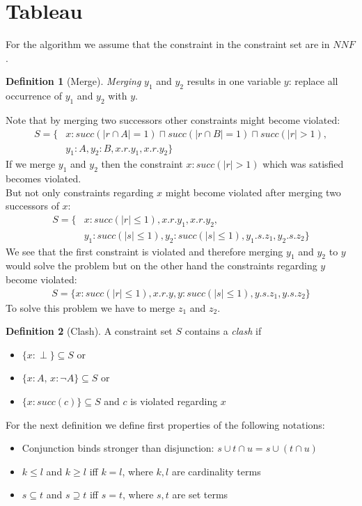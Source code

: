 \documentclass[a4paper,11pt]{scrartcl}
\theoremstyle{break}
\theoremstyle{definition}
\newtheorem{mydef}{Definition}
\begin{document}
\section{Tableau}
For the algorithm we assume that the constraint in the constraint set are in $NNF$.
\begin{mydef}[Merge]
\textit{Merging} $y_1$ and $y_2$ results in one variable $y$: replace all occurrence of $y_1$ and $y_2$ with $y$. 
\end{mydef}
Note that by merging two successors other constraints might become violated:
\begin{align}
S=\{&x:succ(|r\cap A|=1)\sqcap succ(|r\cap B|=1)\sqcap succ(|r|>1),\nonumber\\ &y_1:A, y_2:B, x.r.y_1, x.r.y_2\}
\end{align}
If we merge $y_1$ and $y_2$ then the constraint $x:succ(|r|>1)$ which was satisfied becomes violated.\\
But not only constraints regarding $x$ might become violated after merging two successors of $x$: 
\begin{align}
S=\{&x:succ(|r|\leq 1), x.r.y_1, x.r.y_2,\nonumber
\\&y_1:succ(|s|\leq 1), y_2:succ(|s|\leq 1), y_1.s.z_1, y_2.s.z_2\}
\end{align}
We see that the first constraint is violated and therefore merging $y_1$ and $y_2$ to $y$ would solve the problem but on the other hand the constraints regarding $y$ become violated: 
\begin{align*}
S=\{x:succ(|r|\leq 1), x.r.y,
y:succ(|s|\leq 1), y.s.z_1, y.s.z_2\}
\end{align*}
To solve this problem we have to merge $z_1$ and $z_2$.
\begin{mydef}[Clash]
A constraint set $S$ contains a \textit{clash} if
\begin{itemize}
\item $\{x:\perp\}\subseteq S$ or
\item $\{x:A,\,x:\neg A\}\subseteq S$ or
\item $\{x:succ(c)\}\subseteq S$ and $c$ is violated regarding $x$
\end{itemize}
\end{mydef}
For the next definition we define first properties of the following notations:
\begin{itemize}
\item Conjunction binds stronger than disjunction: $s\cup t\cap u = s\cup (t\cap u)$
\item $k\leq l$ and $k\geq l$ iff $k=l$, where $k,l$ are cardinality terms
\item $s\subseteq t$ and $s\supseteq t$ iff $s=t$, where $s,t$ are set terms
\end{itemize}
\end{document}
